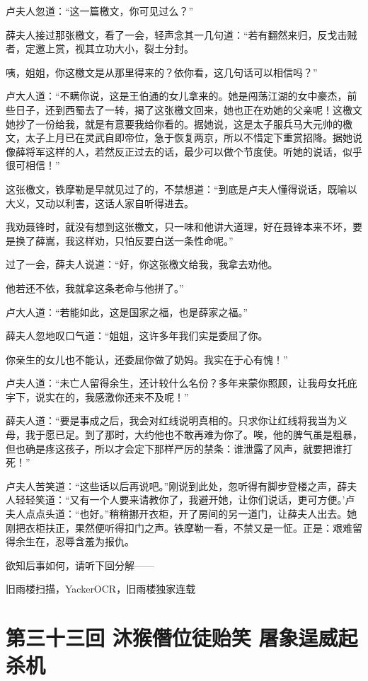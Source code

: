 \documentclass[12pt,oneside]{book}
\begin{document}
卢夫人忽道：``这一篇檄文，你可见过么？''

薛夫人接过那张檄文，看了一会，轻声念其一几句道：``若有翻然来归，反戈击贼者，定邀上赏，视其立功大小，裂土分封。

咦，姐姐，你这檄文是从那里得来的？依你看，这几句话可以相信吗？''

卢大人道：``不瞒你说，这是王伯通的女儿拿来的。她是闯荡江湖的女中豪杰，前些日子，还到西蜀去了一转，揭了这张檄文回来，她也正在劝她的父亲呢！这檄文她抄了一份给我，就是有意要我给你看的。据她说，这是太子服兵马大元帅的檄文，太子上月已在灵武自即帝位，急于恢复两京，所以不惜定下重赏招降。据她说像薛将军这样的人，若然反正过去的话，最少可以做个节度使。听她的说话，似乎很可相信！''

这张檄文，铁摩勒是早就见过了的，不禁想道：``到底是卢夫人懂得说话，既喻以大义，又动以利害，这话人家自听得进去。

我劝聂锋时，就没有想到这张檄文，只一味和他讲大道理，好在聂锋本来不坏，要是换了薛嵩，我这样劝，只怕反要白送一条性命呢。''

过了一会，薛夫人说道：``好，你这张檄文给我，我拿去劝他。

他若还不依，我就拿这条老命与他拼了。''

卢大人道：``若能如此，这是国家之福，也是薛家之福。''

薛夫人忽地叹口气道：``姐姐，这许多年我们实是委屈了你。

你亲生的女儿也不能认，还委屈你做了奶妈。我实在于心有愧！''

卢夫人道：``未亡人留得余生，还计较什么名份？多年来蒙你照顾，让我母女托庇宇下，说实在的，我感激你还来不及呢！''

薛夫人道：``要是事成之后，我会对红线说明真相的。只求你让红线将我当为义母，我于愿已足。到了那时，大约他也不敢再难为你了。唉，他的脾气虽是粗暴，但也确是疼这孩子，所以才会定下那样严厉的禁条：谁泄露了风声，就要把谁打死！''

卢夫人苦笑道：``这些话以后再说吧。''刚说到此处，忽听得有脚步登楼之声，薛夫人轻轻笑道：``又有一个人要来请教你了，我避开她，让你们说话，更可方便。'卢夫人点点头道：``也好。''稍稍挪开衣柜，开了房间的另一道门，让薛夫人出去。她刚把衣柜扶正，果然便听得扣门之声。铁摩勒一看，不禁又是一怔。正是：艰难留得余生在，忍辱含羞为报仇。

欲知后事如何，请听下回分解------

旧雨楼扫描，YackerOCR，旧雨楼独家连载

\chapter{第三十三回 沐猴僭位徒贻笑
屠象逞威起杀机}\label{ux7b2cux4e09ux5341ux4e09ux56de-ux6c90ux7334ux50edux4f4dux5f92ux8d3bux7b11-ux5c60ux8c61ux901eux5a01ux8d77ux6740ux673a}
\end{document}
